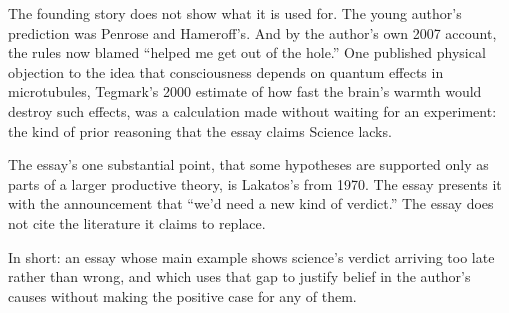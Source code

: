 \begin{afterword}
The founding story does not show what it is used for. The young author's prediction was Penrose and Hameroff's. And by the author's own 2007 account, the rules now blamed ``helped me get out of the hole.'' One published physical objection to the idea that consciousness depends on quantum effects in microtubules, Tegmark's 2000 estimate of how fast the brain's warmth would destroy such effects, was a calculation made without waiting for an experiment: the kind of prior reasoning that the essay claims Science lacks.

The essay's one substantial point, that some hypotheses are supported only as parts of a larger productive theory, is Lakatos's from 1970. The essay presents it with the announcement that ``we'd need a new kind of verdict.'' The essay does not cite the literature it claims to replace.

In short: an essay whose main example shows science's verdict arriving too late rather than wrong, and which uses that gap to justify belief in the author's causes without making the positive case for any of them.
\end{afterword}
